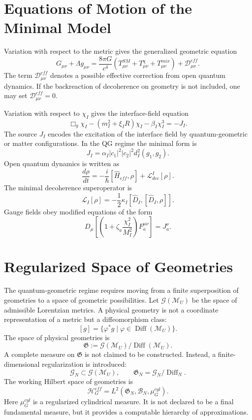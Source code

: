 \documentclass[12pt,a4paper]{article}
\DeclareMathOperator{\Diff}{Diff}
\newcommand{\M}{\mathcal M_U}
\newcommand{\Hilb}{\mathcal H}
\newcommand{\gfrak}{\mathfrak G}
\begin{document}
\section{Equations of Motion of the Minimal Model}
Variation with respect to the metric gives the generalized geometric equation
\[
\boxed{
G_{\mu\nu}+\Lambda g_{\mu\nu}
=\frac{8\pi G}{c^4}\left(T_{\mu\nu}^{SM}+T_{\mu\nu}^{\chi}+T_{\mu\nu}^{mix}\right)+\mathcal D_{\mu\nu}^{eff}.
}
\]
The term $\mathcal D_{\mu\nu}^{eff}$ denotes a possible effective correction from open quantum dynamics. If the backreaction of decoherence on geometry is not included, one may set $\mathcal D_{\mu\nu}^{eff}=0$.

Variation with respect to $\chi_I$ gives the interface-field equation
\[
\boxed{
\Box_g\chi_I-(m_I^2+\xi_I R)\chi_I-\beta_I\chi_I^3=-J_I.
}
\]
The source $J_I$ encodes the excitation of the interface field by quantum-geometric or matter configurations. In the QG regime the minimal form is
\[
\boxed{J_I=\alpha_I |c_1|^2|c_2|^2d_I^2(g_1,g_2).}
\]
Open quantum dynamics is written as
\[
\boxed{
\frac{d\rho}{dt}=-\frac{i}{\hbar}[\widehat H_{eff},\rho]+\mathcal L_{dec}^{I}[\rho].
}
\]
The minimal decoherence superoperator is
\[
\boxed{
\mathcal L_I[\rho]=-\frac{1}{2}\kappa_I[\widehat D_I,[\widehat D_I,\rho]].
}
\]
Gauge fields obey modified equations of the form
\[
\boxed{
D_\mu\left[\left(1+\zeta_a\frac{\chi_I^2}{M_I^2}\right)F_a^{\mu\nu}\right]=J_a^\nu.
}
\]

\section{Regularized Space of Geometries}
The quantum-geometric regime requires moving from a finite superposition of geometries to a space of geometric possibilities. Let $\mathcal G(\M)$ be the space of admissible Lorentzian metrics. A physical geometry is not a coordinate representation of a metric but a diffeomorphism class:
\[
\boxed{[g]=\{\varphi^*g\mid \varphi\in\Diff(\M)\}.}
\]
The space of physical geometries is
\[
\boxed{\gfrak:=\mathcal G(\M)/\Diff(\M).}
\]
A complete measure on $\gfrak$ is not claimed to be constructed. Instead, a finite-dimensional regularization is introduced:
\[
\boxed{\mathcal G_N\subset\mathcal G(\M),\qquad \gfrak_N=\mathcal G_N/\Diff_N.}
\]
The working Hilbert space of geometries is
\[
\boxed{
\Hilb_G^{eff}=L^2(\gfrak_N,\mathcal B_N,\mu_G^{cyl}).
}
\]
Here $\mu_G^{cyl}$ is a regularized cylindrical measure. It is not declared to be a final fundamental measure, but it provides a computable hierarchy of approximations.
\end{document}
